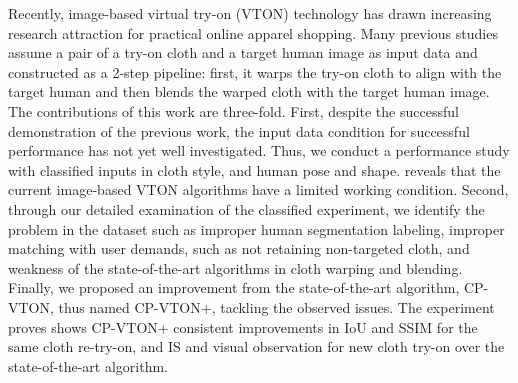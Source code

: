 \documentclass[runningheads]{llncs}
\begin{document}
Recently, image-based virtual try-on (VTON) technology has
drawn increasing research attraction for practical online apparel shopping.
Many previous studies assume a pair of a try-on cloth and a
target human image as input data and constructed as a 2-step pipeline: first, it warps the try-on cloth to
align with the target human and then blends the warped cloth with the
target human image. The contributions of this work are three-fold. First,
despite the successful demonstration of the previous work, the input data
condition for successful performance has not yet well investigated. Thus, we conduct a performance study with classified inputs in cloth style, and human pose and shape. reveals that the current image-based VTON algorithms have a limited working condition. Second, through our detailed examination of the classified experiment, we identify the problem in the dataset such as improper human segmentation labeling, improper matching with user demands, such as not retaining non-targeted cloth, and weakness of the state-of-the-art algorithms in cloth warping and blending. Finally, we proposed an improvement from the state-of-the-art algorithm, CP-VTON,  thus named CP-VTON+, tackling the observed issues. The experiment proves shows CP-VTON+ consistent improvements in IoU and SSIM for the same cloth re-try-on, and IS and visual observation for new cloth try-on over the state-of-the-art algorithm.
  
     
\clearpage
%
%


\end{document}
